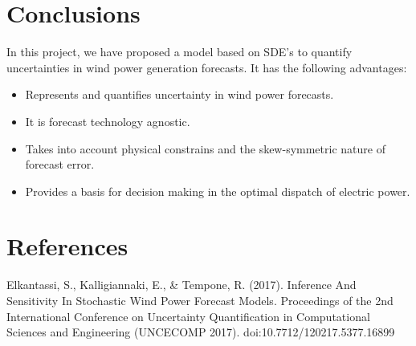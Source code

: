 \documentclass[ima, 20pt, portrait, plainboxedsections]{sciposter}
\begin{document}
\begin{multicols}{3}
\section*{Conclusions}
In this project, we have proposed a model based on SDE's to quantify uncertainties in wind power generation forecasts. It has the following advantages:
\begin{itemize}
\item  Represents and quantifies  uncertainty in wind power forecasts.
\item It is forecast technology agnostic.
\item  Takes into account physical constrains and the skew-symmetric nature of forecast error.
\item Provides a basis for decision making in the optimal dispatch of electric power.
\end{itemize}


\section*{References}
\begin{flushleft}
[1] {Elkantassi, S., Kalligiannaki, E., \& Tempone, R. (2017). Inference And Sensitivity In Stochastic Wind Power Forecast Models. Proceedings of the 2nd International Conference on Uncertainty Quantification in Computational Sciences and Engineering (UNCECOMP 2017). doi:10.7712/120217.5377.16899}
\end{flushleft}

\end{multicols}
\end{document}
